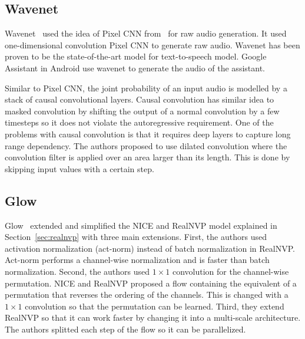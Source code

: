 \documentclass[runningheads]{llncs}
\begin{document}

\subsection{Wavenet}
Wavenet~\cite{van2016wavenet} used the idea of Pixel CNN from~\cite{oord2016pixel} for raw audio generation. It used one-dimensional convolution Pixel CNN to generate raw audio. Wavenet has been proven to be the state-of-the-art model for text-to-speech model. Google Assistant in Android use wavenet to generate the audio of the assistant. 

Similar to Pixel CNN, the joint probability of an input audio is modelled by a stack of causal convolutional layers. Causal convolution has similar idea to masked convolution by shifting the output of a normal convolution by a few timesteps so it does not violate the autoregressive requirement. One of the problems with causal convolution is that it requires deep layers to capture long range dependency. The authors proposed to use dilated convolution where the convolution filter is applied over an area larger than its length. This is done by skipping input values with a certain step. 

\subsection{Glow}
Glow~\cite{kingma2018glow} extended and simplified the NICE and RealNVP model explained in Section~\ref{sec:realnvp} with three main extensions. First, the authors used activation normalization (act-norm) instead of batch normalization in RealNVP.  Act-norm performs a channel-wise normalization and is faster than batch normalization. Second, the authors used $1\times1$ convolution for the channel-wise permutation. NICE and RealNVP proposed a flow containing the equivalent of a permutation that reverses the ordering of the channels. This is changed with a $1\times1$ convolution so that the permutation can be learned.  Third, they extend RealNVP so that it can work faster by changing it into a multi-scale architecture. The authors splitted each step of the flow so it can be parallelized.
\end{document}
